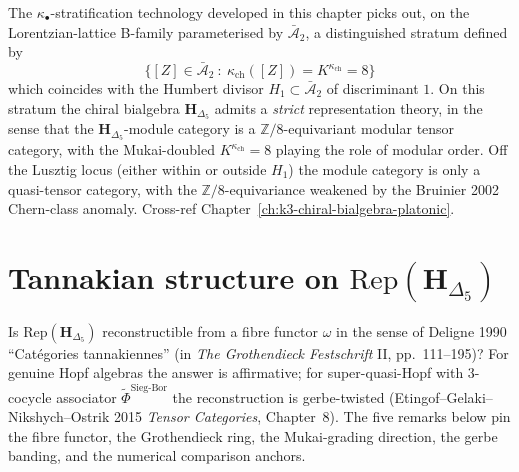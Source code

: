 \begin{remark}
\label{rem:cydkappa-k3-b-family}
The $\kappa_\bullet$-stratification technology developed in this chapter picks
out, on the Lorentzian-lattice B-family parameterised by $\bar{\mathcal A}_2$,
a distinguished stratum defined by
\[
\bigl\{[Z]\in\bar{\mathcal A}_2\ :\ \kappa_{\mathrm{ch}}([Z]) = K^{\kappa_{\mathrm{ch}}} = 8\bigr\}
\]
which coincides with the Humbert divisor $H_1\subset\bar{\mathcal A}_2$
of discriminant $1$. On this stratum the chiral bialgebra
$\mathbf H_{\Delta_5}$ admits a \emph{strict} representation theory,
in the sense that the $\mathbf H_{\Delta_5}$-module category is a
$\mathbb Z/8$-equivariant modular tensor category, with the
Mukai-doubled $K^{\kappa_{\mathrm{ch}}} = 8$ playing the role of
modular order. Off the Lusztig locus (either within or outside $H_1$)
the module category is only a quasi-tensor category, with the
$\mathbb Z/8$-equivariance weakened by the Bruinier 2002 Chern-class
anomaly. Cross-ref Chapter~\ref{ch:k3-chiral-bialgebra-platonic}.
\end{remark}

\section{Tannakian structure on \texorpdfstring{$\mathrm{Rep}(\mathbf H_{\Delta_5})$}{Rep(H-Delta-5)}}
\label{sec:cydkappa-tannakian-gerbe}

Is $\mathrm{Rep}(\mathbf H_{\Delta_5})$ reconstructible from a fibre
functor $\omega$ in the sense of Deligne 1990
``Cat\'egories tannakiennes'' (in \emph{The Grothendieck Festschrift}
II, pp.~111--195)? For genuine Hopf algebras the answer is
affirmative; for super-quasi-Hopf with $3$-cocycle associator
$\widetilde{\Phi}^{\mathrm{Sieg\text{-}Bor}}$ the reconstruction is
gerbe-twisted (Etingof--Gelaki--Nikshych--Ostrik 2015
\emph{Tensor Categories}, Chapter~8). The five remarks below pin
the fibre functor, the Grothendieck ring, the Mukai-grading
direction, the gerbe banding, and the numerical comparison anchors.

